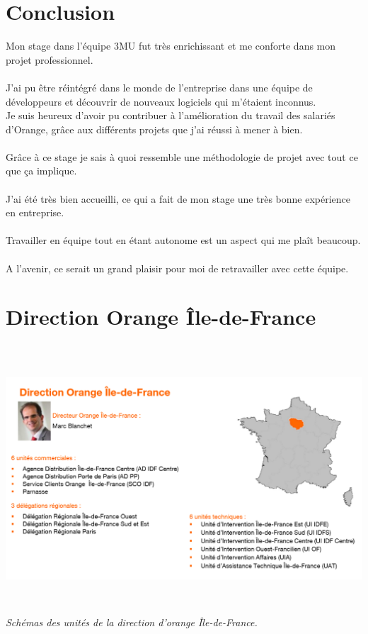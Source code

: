 \documentclass[a4paper,twoside,12pt,openright]{report}
\begin{document}
\chapter{Conclusion}
Mon stage dans l’équipe 3MU fut très enrichissant et me conforte dans mon projet professionnel.\\\\
J’ai pu être réintégré dans le monde de l’entreprise dans une équipe de développeurs et découvrir de nouveaux logiciels qui m’étaient inconnus.\\
Je suis heureux d'avoir pu contribuer à l'amélioration du travail des salariés d'Orange, grâce aux différents projets que j'ai réussi à mener à bien.\\\\
Grâce à ce stage je sais à quoi ressemble une méthodologie de projet avec tout ce que ça implique.\\\\
J’ai été très bien accueilli, ce qui a fait de mon stage une très bonne expérience en entreprise.\\\\
Travailler en équipe tout en étant autonome est un aspect qui me plaît beaucoup.\\\\
A l'avenir, ce serait un grand plaisir pour moi de retravailler avec cette équipe.
\newpage
\appendix
\chapter{Direction Orange Île-de-France}
\begin{center}
\includegraphics[height=10cm]{direction.PNG}\\
\itshape Schémas des unités de la direction d'orange Île-de-France.
\end{center}
\end{document}
